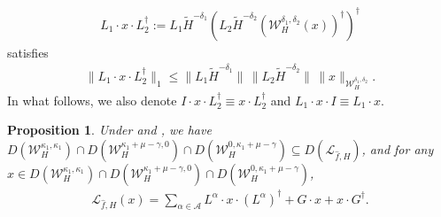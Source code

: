 \documentclass[11pt]{amsart}
\newcommand{\1}{\mathbbm{1}}
\theoremstyle{plain}
\newtheorem{proposition}[theorem]{Proposition}
\theoremstyle{definition}
\theoremstyle{remark}
\numberwithin{equation}{section}
\begin{document}
\begin{align*}
L_1\cdot  x\cdot L_2^\dagger:=L_1\widetilde{H}^{-\delta_1}(L_2\widetilde{H}^{-\delta_2}(\mathcal{W}_H^{\delta_1,\delta_2}(x))^\dagger)^\dagger
\end{align*}
satisfies
\begin{align*}
\|L_1\cdot x\cdot L_2^\dagger\|_1\le \|L_1\widetilde{H}^{-\delta_1}\|\,\|L_2\widetilde{H}^{-\delta_2}\|\,\|x\|_{\mathcal{W}^{\delta_1,\delta_2}_H}. 
\end{align*}
In what follows, we also denote $I\cdot x\cdot L^\dagger_2\equiv x\cdot L^\dagger_2$ and $L_1\cdot x\cdot I\equiv  L_1\cdot x$.
\begin{proposition}\label{prop.generationtheorem} Under  and , we have $ D(\mathcal{W}_H^{\kappa_1,\kappa_1})\cap D(\mathcal{W}_H^{\kappa_1+\mu-\gamma,0})\cap D(\mathcal{W}_H^{0,\kappa_1+\mu-\gamma}) \subseteq D(\mathcal{L}_{\widehat{f},H})$, and for any $x\in D(\mathcal{W}_H^{\kappa_1,\kappa_1})\cap D(\mathcal{W}_H^{\kappa_1+\mu-\gamma,0})\cap D(\mathcal{W}_H^{0,\kappa_1+\mu-\gamma})$,
\begin{align}\label{eq.LindbladformL}
\mathcal{L}_{\widehat{f},H}(x)=\sum_{\alpha\in\mathcal{A}}L^\alpha\cdot x\cdot (L^\alpha)^\dagger+G\cdot x+x\cdot G^\dagger.
\end{align}
\end{proposition}
\end{document}
